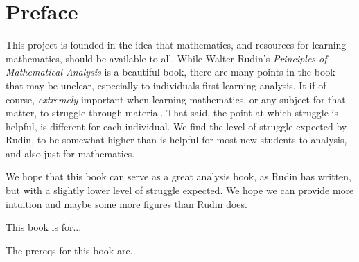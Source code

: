 \documentclass[../../templates/chapter]{subfiles}
\begin{document}
\chapter*{Preface}\label{chap:00-preface}

This project is founded in the idea that mathematics, and resources for
learning mathematics, should be available to all. While Walter Rudin's
\emph{Principles of Mathematical Analysis}\cite{rudin} is a beautiful book,
there are many points in the book that may be unclear, especially to
individuals first learning analysis. It if of course, \emph{extremely}
important when learning mathematics, or any subject for that matter, to
struggle through material. That said, the point at which struggle is helpful,
is different for each individual.  We find the level of struggle expected by
Rudin, to be somewhat higher than is helpful for most new students to analysis,
and also just for mathematics.

We hope that this book can serve as a great analysis book, as Rudin has
written, but with a slightly lower level of struggle expected. We hope we can
provide more intuition and maybe some more figures than Rudin does.

This book is for...

The prereqs for this book are...
\end{document}
